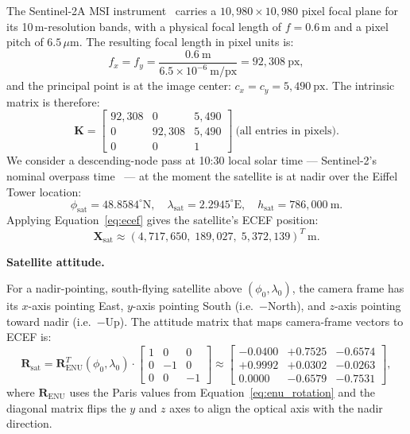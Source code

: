 \documentclass{book}
\begin{document}
The Sentinel-2A MSI instrument~\cite{drusch2012sentinel} carries a
$10{,}980 \times 10{,}980$ pixel focal plane for its 10\,m-resolution
bands, with a physical focal length of $f = 0.6$\,m and a pixel pitch
of $6.5\,\mu$m.  The resulting focal length in pixel units is:
\[
  f_x = f_y = \frac{0.6\ \text{m}}{6.5 \times 10^{-6}\ \text{m/px}}
            = 92{,}308\ \text{px},
\]
and the principal point is at the image center:
$c_x = c_y = 5{,}490\ \text{px}$.  The intrinsic matrix is therefore:
\[
  \mathbf{K} =
  \begin{bmatrix}
    92{,}308 & 0        & 5{,}490 \\
    0        & 92{,}308 & 5{,}490 \\
    0        & 0        & 1
  \end{bmatrix}\ \text{(all entries in pixels)}.
\]
We consider a descending-node pass at 10:30 local solar time ---
Sentinel-2's nominal overpass time~\cite{drusch2012sentinel} --- at
the moment the satellite is at nadir over the Eiffel Tower location:
\[
  \phi_{\text{sat}} = 48.8584^\circ\text{N},\quad
  \lambda_{\text{sat}} = 2.2945^\circ\text{E},\quad
  h_{\text{sat}} = 786{,}000\ \text{m}.
\]
Applying Equation~\eqref{eq:ecef} gives the satellite's ECEF position:
\[
  \mathbf{X}_{\text{sat}}
  \approx (4{,}717{,}650,\; 189{,}027,\; 5{,}372{,}139)^T\ \text{m}.
\]

\medskip
\noindent\textbf{Satellite attitude.}

For a nadir-pointing, south-flying satellite above $(\phi_0,\lambda_0)$,
the camera frame has its $x$-axis pointing East, $y$-axis pointing
South (i.e.\ $-$North), and $z$-axis pointing toward nadir
(i.e.\ $-$Up).  The attitude matrix that maps camera-frame vectors
to ECEF is:
\[
  \mathbf{R}_{\text{sat}}
  = \mathbf{R}_{\text{ENU}}^T(\phi_0, \lambda_0)\cdot
  \begin{bmatrix}1&0&0\\0&-1&0\\0&0&-1\end{bmatrix}
  \approx
  \begin{bmatrix}
   -0.0400 & +0.7525 & -0.6574 \\
   +0.9992 & +0.0302 & -0.0263 \\
    0.0000 & -0.6579 & -0.7531
  \end{bmatrix},
\]
where $\mathbf{R}_{\text{ENU}}$ uses the Paris values from
Equation~\eqref{eq:enu_rotation} and the diagonal matrix flips the
$y$ and $z$ axes to align the optical axis with the nadir direction.
\end{document}
